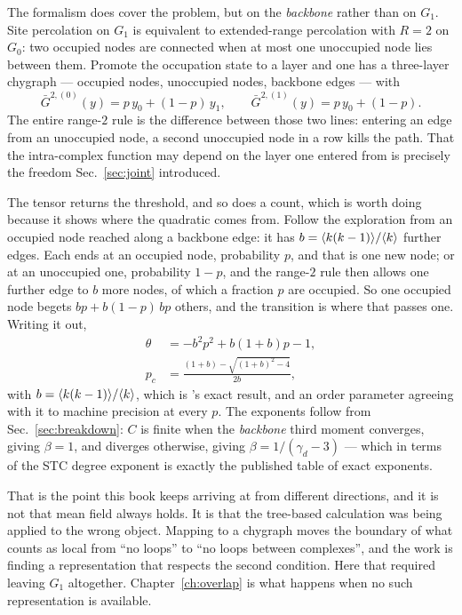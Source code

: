 The formalism does cover the problem, but on the \emph{backbone} rather than on
$G_{1}$. Site percolation on $G_{1}$ is equivalent to extended-range percolation
with $R=2$ on $G_{0}$: two occupied nodes are connected when at most one
unoccupied node lies between them. Promote the occupation state to a layer and
one has a three-layer chygraph --- occupied nodes, unoccupied nodes, backbone
edges --- with
\begin{equation}
  \bar G^{2,(0)}(y)=p\,y_{0}+(1-p)\,y_{1},
  \qquad
  \bar G^{2,(1)}(y)=p\,y_{0}+(1-p).
  \label{eq:stc}
\end{equation}
The entire range-$2$ rule is the difference between those two lines: entering an
edge from an unoccupied node, a second unoccupied node in a row kills the path.
That the intra-complex function may depend on the layer one entered from is
precisely the freedom Sec.~\ref{sec:joint} introduced.

The tensor returns the threshold, and so does a count, which is worth doing
because it shows where the quadratic comes from. Follow the exploration from an
occupied node reached along a backbone edge: it has $b=\langle k(k-1) \rangle/\langle k \rangle$
further edges. Each ends at an occupied node, probability $p$, and that is one
new node; or at an unoccupied one, probability $1-p$, and the range-$2$ rule
then allows one further edge to $b$ more nodes, of which a fraction $p$ are
occupied. So one occupied node begets $bp+b(1-p)\,bp$ others, and the
transition is where that passes one. Writing it out,
\begin{equation}
  \begin{aligned}
    \theta&=-b^{2}p^{2}+b(1+b)p-1,\\
    p_{c}&=\frac{(1+b)-\sqrt{(1+b)^{2}-4}}{2b},
  \end{aligned}
  \label{eq:stcthresh}
\end{equation}
with $b=\langle k(k-1) \rangle/\langle k \rangle$, which is \citeauthor{cirigliano2025}'s exact result, and an order
parameter agreeing with it to machine precision at every $p$. The exponents
follow from Sec.~\ref{sec:breakdown}: $C$ is finite when the \emph{backbone}
third moment converges, giving $\beta=1$, and diverges otherwise, giving
$\beta=1/(\gamma_{d}-3)$ --- which in terms of the STC degree exponent is
exactly the published table of exact exponents.

That is the point this book keeps arriving at from different directions, and
it is not that mean field always holds. It is that the tree-based calculation
was being applied to the wrong object. Mapping to a chygraph moves the boundary
of what counts as local from ``no loops'' to ``no loops between complexes'', and
the work is finding a representation that respects the second condition. Here
that required leaving $G_{1}$ altogether. Chapter~\ref{ch:overlap} is what
happens when no such representation is available.

